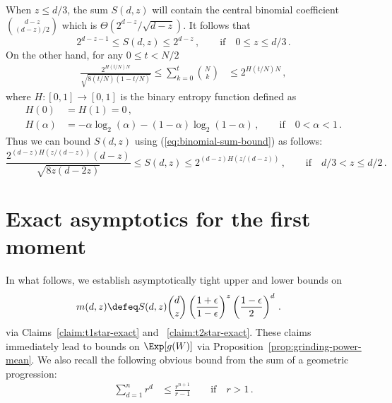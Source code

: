 When $z \leq d/3$, the sum $S(d,z)$ will contain the central binomial coefficient ${d-z \choose (d-z)/2}$ which is $\Theta(2^{d-z}/\sqrt{d-z})$. 
It follows that 
\begin{equation} \label{eq:S_d_z_small}
    2^{d-z-1} 
    \leq 
    S(d,z)
    \leq 2^{d-z}\,, 
    \qquad \text{if}\quad 0 \leq z \leq d/3 
    \,.
\end{equation}
On the other hand, for any $0 \leq t < N/2$
\begin{align}\label{eq:binomial-sum-bound}
\frac{2^{H(t/N)N} }{\sqrt{8 (t/N) (1-t/N)} }
\leq 
\sum_{k=0}^t{ {N \choose k} } 
&\leq 
2^{H(t/N)N} \, , 
\end{align}
where $H : [0, 1] \rightarrow [0, 1]$ is the binary entropy function defined as
\begin{align*}
    H(0) &= H(1) = 0\, , \\
    H(\alpha) &= -\alpha \log_2(\alpha) - (1-\alpha) \log_2(1-\alpha)\,, 
        \qquad \text{if}\quad 0 < \alpha < 1\, .
\end{align*}
Thus we can bound $S(d,z)$ using (\ref{eq:binomial-sum-bound}) as follows:
\begin{equation} \label{eq:S_d_z_large}
    \frac{2^{(d-z)H(z/(d-z))}(d-z)}{\sqrt{8 z(d-2z) }}
    \leq
    S(d, z) 
    \leq
    2^{(d-z)H(z/(d-z))}
    \,,\qquad \text{if} \quad d/3 < z \leq d/2 
    \,.
\end{equation}


\section{Exact asymptotics for the first moment}
\newcommand{\DoverTwo}{\lfloor d/2 \rfloor}
\newcommand{\DoverThree}{d/3}

In what follows, we establish asymptotically tight upper and lower bounds on 
\begin{align}\label{eq:m_z}
m(d,z) 
&\defeq S(d,z) {d \choose z} \left(\frac{1+\epsilon}{1-\epsilon}\right)^{z} \left(\frac{1-\epsilon}{2}\right)^{d} \, .
\end{align}
via Claims~\ref{claim:t1star-exact} and ~\ref{claim:t2star-exact}. These claims immediately lead to bounds on $\Exp[ g(W) ]$ via Proposition~\ref{prop:grinding-power-mean}.
We also recall the following obvious bound from the sum of a geometric progression:
\begin{align}\label{eq:geom-series-bound}
\sum_{d=1}^n{r^d} 
&\leq \frac{r^{n+1}}{r-1} \qquad \text{if}\quad r > 1\, .
\end{align}





